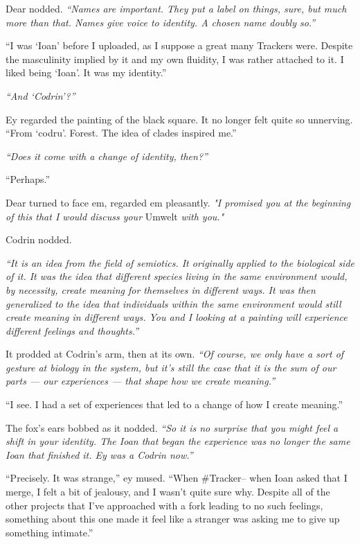 Dear nodded. \emph{``Names are important. They put a label on things, sure, but much more than that. Names give voice to identity. A chosen name doubly so.''}

``I was `Ioan' before I uploaded, as I suppose a great many Trackers were. Despite the masculinity implied by it and my own fluidity, I was rather attached to it. I liked being `Ioan'. It was my identity.''

\emph{``And `Codrin'?''}

Ey regarded the painting of the black square. It no longer felt quite so unnerving. ``From `codru'. Forest. The idea of clades inspired me.''

\emph{``Does it come with a change of identity, then?''}

``Perhaps.''

Dear turned to face em, regarded em pleasantly. \emph{"I promised you at the beginning of this that I would discuss your} Umwelt \emph{with you."}

Codrin nodded.

\emph{``It is an idea from the field of semiotics. It originally applied to the biological side of it. It was the idea that different species living in the same environment would, by necessity, create meaning for themselves in different ways. It was then generalized to the idea that individuals within the same environment would still create meaning in different ways. You and I looking at a painting will experience different feelings and thoughts.''}

It prodded at Codrin's arm, then at its own. \emph{``Of course, we only have a sort of gesture at biology in the system, but it's still the case that it is the sum of our parts — our experiences — that shape how we create meaning.''}

``I see. I had a set of experiences that led to a change of how I create meaning.''

The fox's ears bobbed as it nodded. \emph{``So it is no surprise that you might feel a shift in your identity. The Ioan that began the experience was no longer the same Ioan that finished it. Ey was a Codrin now.''}

``Precisely. It was strange,'' ey mused. ``When \#Tracker-- when Ioan asked that I merge, I felt a bit of jealousy, and I wasn't quite sure why. Despite all of the other projects that I've approached with a fork leading to no such feelings, something about this one made it feel like a stranger was asking me to give up something intimate.''

